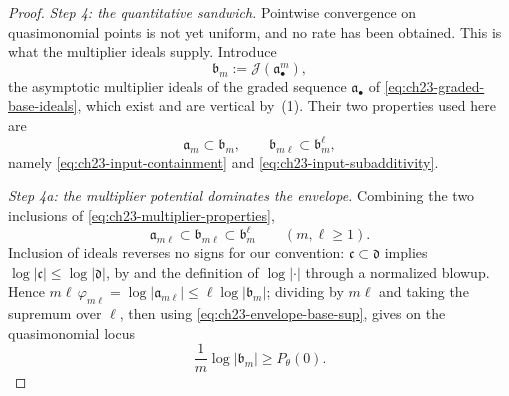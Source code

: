 \begin{proof}
\emph{Step 4: the quantitative sandwich.}
Pointwise convergence on quasimonomial points is not yet uniform, and no
rate has been obtained.  This is what the multiplier ideals supply.
Introduce
\begin{equation}\label{eq:ch23-asymptotic-multiplier}
                         \mathfrak b_m
                         :=\mathcal J(\mathfrak a_\bullet^m),
\end{equation}
the asymptotic multiplier ideals of the graded sequence
\(\mathfrak a_\bullet\) of \eqref{eq:ch23-graded-base-ideals}, which exist
and are vertical by \,(1).  Their
two properties used here are
\begin{equation}\label{eq:ch23-multiplier-properties}
 \mathfrak a_m\subset\mathfrak b_m,
 \qquad
 \mathfrak b_{m\ell}\subset\mathfrak b_m^\ell,
\end{equation}
namely \eqref{eq:ch23-input-containment} and
\eqref{eq:ch23-input-subadditivity}.

\emph{Step 4a: the multiplier potential dominates the envelope.}
Combining the two inclusions of \eqref{eq:ch23-multiplier-properties},
\[
       \mathfrak a_{m\ell}
       \subset\mathfrak b_{m\ell}
       \subset\mathfrak b_m^\ell
       \qquad(m,\ell\geq1).
\]
Inclusion of ideals reverses no signs for our convention:
\(\mathfrak c\subset\mathfrak d\) implies
\(\log|\mathfrak c|\leq\log|\mathfrak d|\), by
 and the definition of
\(\log|\cdot|\) through a normalized blowup.  Hence
\(m\ell\,\varphi_{m\ell}=\log|\mathfrak a_{m\ell}|\leq
\ell\log|\mathfrak b_m|\); dividing by \(m\ell\) and taking the supremum
over \(\ell\), then using \eqref{eq:ch23-envelope-base-sup}, gives on the
quasimonomial locus
\begin{equation}\label{eq:ch23-multiplier-upper-control}
              \frac1m\log|\mathfrak b_m|
              \geq P_\theta(0).
\end{equation}


\end{proof}
